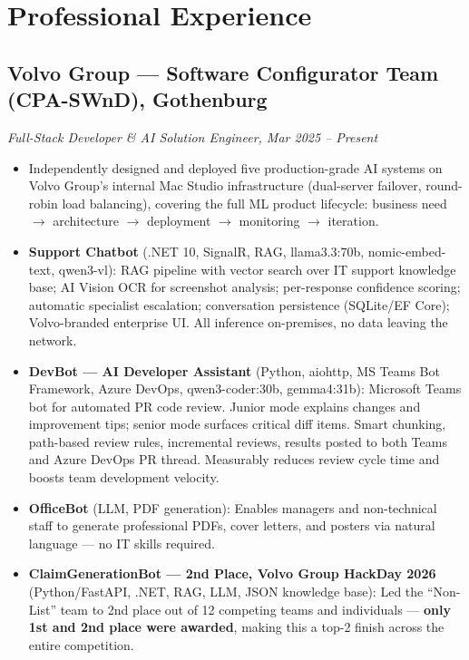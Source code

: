 \documentclass[a4paper,10pt]{article}
\begin{document}
\section*{Professional Experience}

\subsection*{Volvo Group --- Software Configurator Team (CPA-SWnD), Gothenburg}
\textit{Full-Stack Developer \& AI Solution Engineer, Mar 2025 -- Present}
\begin{itemize}[noitemsep]
  \item Independently designed and deployed five production-grade AI systems on Volvo
        Group's internal Mac Studio infrastructure (dual-server failover, round-robin
        load balancing), covering the full ML product lifecycle: business need $\to$
        architecture $\to$ deployment $\to$ monitoring $\to$ iteration.
  \item \textbf{Support Chatbot} (.NET 10, SignalR, RAG, llama3.3:70b, nomic-embed-text,
        qwen3-vl): RAG pipeline with vector search over IT support knowledge base; AI
        Vision OCR for screenshot analysis; per-response confidence scoring; automatic
        specialist escalation; conversation persistence (SQLite/EF Core); Volvo-branded
        enterprise UI. All inference on-premises, no data leaving the network.
  \item \textbf{DevBot --- AI Developer Assistant} (Python, aiohttp, MS Teams Bot
        Framework, Azure DevOps, qwen3-coder:30b, gemma4:31b): Microsoft Teams bot for
        automated PR code review. Junior mode explains changes and improvement tips;
        senior mode surfaces critical diff items. Smart chunking, path-based review rules,
        incremental reviews, results posted to both Teams and Azure DevOps PR thread.
        Measurably reduces review cycle time and boosts team development velocity.
  \item \textbf{OfficeBot} (LLM, PDF generation): Enables managers and non-technical
        staff to generate professional PDFs, cover letters, and posters via natural
        language --- no IT skills required.
  \item \textbf{ClaimGenerationBot --- 2nd Place, Volvo Group HackDay 2026}
        (Python/FastAPI, .NET, RAG, LLM, JSON knowledge base): Led the ``Non-List'' team
        to 2nd place out of 12 competing teams and individuals --- \textbf{only 1st and
        2nd place were awarded}, making this a top-2 finish across the entire competition.

\end{itemize}
\end{document}
